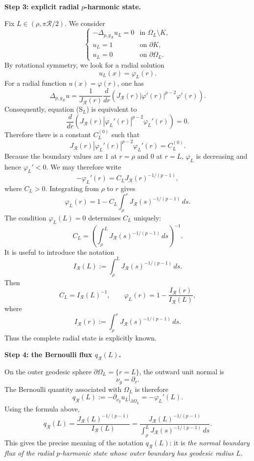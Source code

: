 \documentclass[11pt,a4paper]{article}
\theoremstyle{definition}
\theoremstyle{remark}
\begin{document}
\medskip
\noindent
\textbf{Step 3: explicit radial $p$-harmonic state.}

Fix $L\in(\rho,\pi\mathcal R/2)$. We consider
\[
\begin{cases}
-\Delta_{p,g_{\mathcal R}}u_L=0
&\text{in }\Omega_L\setminus K,\\
 u_L=1&\text{on }\partial K,\\
 u_L=0&\text{on }\partial\Omega_L.
\end{cases}
\tag{S$_L$}
\]
By rotational symmetry, we look for a radial solution
\[
u_L(x)=\varphi_L(r).
\]
For a radial function $u(x)=\varphi(r)$, one has
\[
\Delta_{p,g_{\mathcal R}}u
=
\frac1{J_{\mathcal R}(r)}
\frac{d}{dr}
\left(
J_{\mathcal R}(r)|\varphi'(r)|^{p-2}\varphi'(r)
\right).
\]
Consequently, equation (S$_L$) is equivalent to
\[
\frac{d}{dr}
\left(
J_{\mathcal R}(r)|\varphi_L'(r)|^{p-2}\varphi_L'(r)
\right)=0.
\]
Therefore there is a constant $C_L^{(0)}$ such that
\[
J_{\mathcal R}(r)|\varphi_L'(r)|^{p-2}\varphi_L'(r)=C_L^{(0)}.
\]
Because the boundary values are $1$ at $r=\rho$ and $0$ at $r=L$,
$\varphi_L$ is decreasing and hence $\varphi_L'<0$. We may therefore
write
\[
-\varphi_L'(r)
=C_LJ_{\mathcal R}(r)^{-1/(p-1)},
\]
where $C_L>0$. Integrating from $\rho$ to $r$ gives
\[
\varphi_L(r)
=1-C_L\int_\rho^r
J_{\mathcal R}(s)^{-1/(p-1)}\,ds.
\]
The condition $\varphi_L(L)=0$ determines $C_L$ uniquely:
\[
C_L
=\left(
\int_\rho^L
J_{\mathcal R}(s)^{-1/(p-1)}\,ds
\right)^{-1}.
\]
It is useful to introduce the notation
\[
I_{\mathcal R}(L)
:=\int_\rho^L
J_{\mathcal R}(s)^{-1/(p-1)}\,ds.
\]
Then
\[
C_L=I_{\mathcal R}(L)^{-1},
\qquad
\varphi_L(r)=1-\frac{I_{\mathcal R}(r)}{I_{\mathcal R}(L)},
\]
where
\[
I_{\mathcal R}(r):=
\int_\rho^rJ_{\mathcal R}(s)^{-1/(p-1)}\,ds.
\]
Thus the complete radial state is explicitly known.

\medskip
\noindent
\textbf{Step 4: the Bernoulli flux $q_{\mathcal R}(L)$.}

On the outer geodesic sphere $\partial\Omega_L=\{r=L\}$, the outward
unit normal is
\[
\nu_g=\partial_r.
\]
The Bernoulli quantity associated with $\Omega_L$ is therefore
\[
q_{\mathcal R}(L)
:=-\partial_{\nu_g}u_L\big|_{\partial\Omega_L}
=-\varphi_L'(L).
\]
Using the formula above,
\[
q_{\mathcal R}(L)
=
\frac{J_{\mathcal R}(L)^{-1/(p-1)}}
{I_{\mathcal R}(L)}
=
\frac{J_{\mathcal R}(L)^{-1/(p-1)}}
{\displaystyle\int_\rho^L
J_{\mathcal R}(s)^{-1/(p-1)}\,ds}.
\label{eq:spherical-reference-flux}
\]
This gives the precise meaning of the notation $q_{\mathcal R}(L)$: it is
\emph{the normal boundary flux of the radial $p$-harmonic state whose
outer boundary has geodesic radius $L$}.
\end{document}

